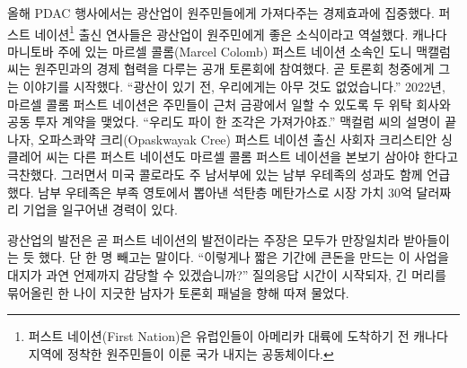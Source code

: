 \documentclass{translation}
\begin{document}
올해 PDAC 행사에서는 광산업이 원주민들에게 가져다주는 경제효과에 집중했다.
퍼스트 네이션\footnote{퍼스트 네이션(First Nation)은 유럽인들이 아메리카 대륙에 도착하기 전 캐나다 지역에 정착한 원주민들이 이룬 국가 내지는 공동체이다.} 출신 연사들은 광산업이 원주민에게 좋은 소식이라고 역설했다.
캐나다 마니토바 주에 있는 마르셀 콜롬(Marcel Colomb) 퍼스트 네이션 소속인 도니 맥캘럼 씨는 원주민과의 경제 협력을 다루는 공개 토론회에 참여했다.
곧 토론회 청중에게 그는 이야기를 시작했다.
``광산이 있기 전, 우리에게는 아무 것도 없었습니다.''
2022년, 마르셀 콜롬 퍼스트 네이션은 주민들이 근처 금광에서 일할 수 있도록 두 위탁 회사와 공동 투자 계약을 맺었다.
``우리도 파이 한 조각은 가져가야죠.''
맥컬럼 씨의 설명이 끝나자, 오파스콰약 크리(Opaskwayak Cree) 퍼스트 네이션 출신 사회자 크리스티안 싱클레어 씨는 다른 퍼스트 네이션도 마르셀 콜롬 퍼스트 네이션을 본보기 삼아야 한다고 극찬했다.
그러면서 미국 콜로라도 주 남서부에 있는 남부 우테족의 성과도 함께 언급했다.
남부 우테족은 부족 영토에서 뽑아낸 석탄층 메탄가스로 시장 가치 30억 달러짜리 기업을 일구어낸 경력이 있다.
%

광산업의 발전은 곧 퍼스트 네이션의 발전이라는 주장은 모두가 만장일치라 받아들이는 듯 했다.
단 한 명 빼고는 말이다.
``이렇게나 짧은 기간에 큰돈을 만드는 이 사업을 대지가 과연 언제까지 감당할 수 있겠습니까?''
질의응답 시간이 시작되자, 긴 머리를 묶어올린 한 나이 지긋한 남자가 토론회 패널을 향해 따져 물었다.
%
\end{document}
